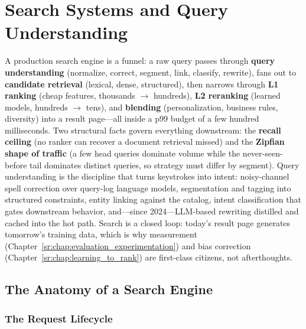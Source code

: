 \chapter{Search Systems and Query Understanding}
\label{sr:chap:search_systems_query_understanding}

\begin{tldr}
A production search engine is a funnel: a raw query passes through \textbf{query understanding} (normalize, correct, segment, link, classify, rewrite), fans out to \textbf{candidate retrieval} (lexical, dense, structured), then narrows through \textbf{L1 ranking} (cheap features, thousands $\to$ hundreds), \textbf{L2 reranking} (learned models, hundreds $\to$ tens), and \textbf{blending} (personalization, business rules, diversity) into a result page---all inside a p99 budget of a few hundred milliseconds. Two structural facts govern everything downstream: the \textbf{recall ceiling} (no ranker can recover a document retrieval missed) and the \textbf{Zipfian shape of traffic} (a few head queries dominate volume while the never-seen-before tail dominates distinct queries, so strategy must differ by segment). Query understanding is the discipline that turns keystrokes into intent: noisy-channel spell correction over query-log language models, segmentation and tagging into structured constraints, entity linking against the catalog, intent classification that gates downstream behavior, and---since 2024---LLM-based rewriting distilled and cached into the hot path. Search is a closed loop: today's result page generates tomorrow's training data, which is why measurement (Chapter~\ref{sr:chap:evaluation_experimentation}) and bias correction (Chapter~\ref{sr:chap:learning_to_rank}) are first-class citizens, not afterthoughts.
\end{tldr}

\section{The Anatomy of a Search Engine}
\label{sr:sec:stack_anatomy}

\subsection{The Request Lifecycle}

